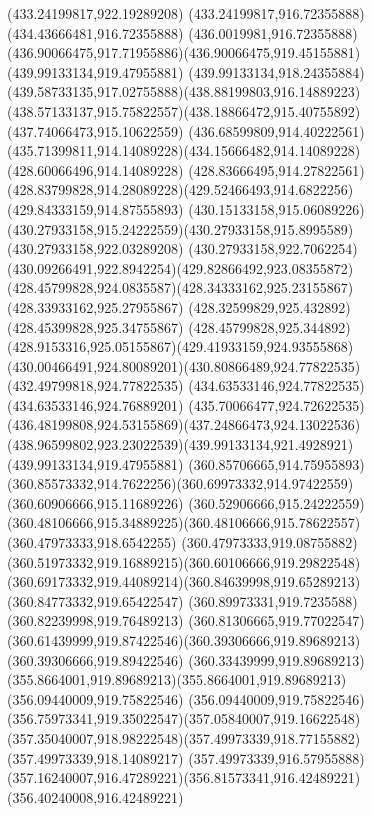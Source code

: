 {{{{				\lineto(433.24199817,922.19289208)
				\lineto(433.24199817,916.72355888)
				\lineto(434.43666481,916.72355888)
				\curveto(436.0019981,916.72355888)(436.90066475,917.71955886)(436.90066475,919.45155881)
				\moveto(439.99133134,919.47955881)
				\curveto(439.99133134,918.24355884)(439.58733135,917.02755888)(438.88199803,916.14889223)
				\curveto(438.57133137,915.75822557)(438.18866472,915.40755892)(437.74066473,915.10622559)
				\curveto(436.68599809,914.40222561)(435.71399811,914.14089228)(434.15666482,914.14089228)
				\lineto(428.60066496,914.14089228)
				\lineto(428.83666495,914.27822561)
				\curveto(428.83799828,914.28089228)(429.52466493,914.6822256)(429.84333159,914.87555893)
				\curveto(430.15133158,915.06089226)(430.27933158,915.24222559)(430.27933158,915.8995589)
				\lineto(430.27933158,922.03289208)
				\curveto(430.27933158,922.7062254)(430.09266491,922.8942254)(429.82866492,923.08355872)
				\curveto(428.45799828,924.0835587)(428.34333162,925.23155867)(428.33933162,925.27955867)
				\lineto(428.32599829,925.432892)
				\lineto(428.45399828,925.34755867)
				\curveto(428.45799828,925.344892)(428.9153316,925.05155867)(429.41933159,924.93555868)
				\curveto(430.00466491,924.80089201)(430.80866489,924.77822535)(432.49799818,924.77822535)
				\lineto(434.63533146,924.77822535)
				\lineto(434.63533146,924.76889201)
				\curveto(435.70066477,924.72622535)(436.48199808,924.53155869)(437.24866473,924.13022536)
				\curveto(438.96599802,923.23022539)(439.99133134,921.4928921)(439.99133134,919.47955881)
				\moveto(360.85706665,914.75955893)
				\curveto(360.85573332,914.7622256)(360.69973332,914.97422559)(360.60906666,915.11689226)
				\curveto(360.52906666,915.24222559)(360.48106666,915.34889225)(360.48106666,915.78622557)
				\lineto(360.47973333,918.6542255)
				\curveto(360.47973333,919.08755882)(360.51973332,919.16889215)(360.60106666,919.29822548)
				\curveto(360.69173332,919.44089214)(360.84639998,919.65289213)(360.84773332,919.65422547)
				\lineto(360.89973331,919.7235588)
				\lineto(360.82239998,919.76489213)
				\curveto(360.81306665,919.77022547)(360.61439999,919.87422546)(360.39306666,919.89689213)
				\lineto(360.39306666,919.89422546)
				\curveto(360.33439999,919.89689213)(355.8664001,919.89689213)(355.8664001,919.89689213)
				\lineto(356.09440009,919.75822546)
				\curveto(356.09440009,919.75822546)(356.75973341,919.35022547)(357.05840007,919.16622548)
				\curveto(357.35040007,918.98222548)(357.49973339,918.77155882)(357.49973339,918.14089217)
				\lineto(357.49973339,916.57955888)
				\curveto(357.16240007,916.47289221)(356.81573341,916.42489221)(356.40240008,916.42489221)
}}}}
